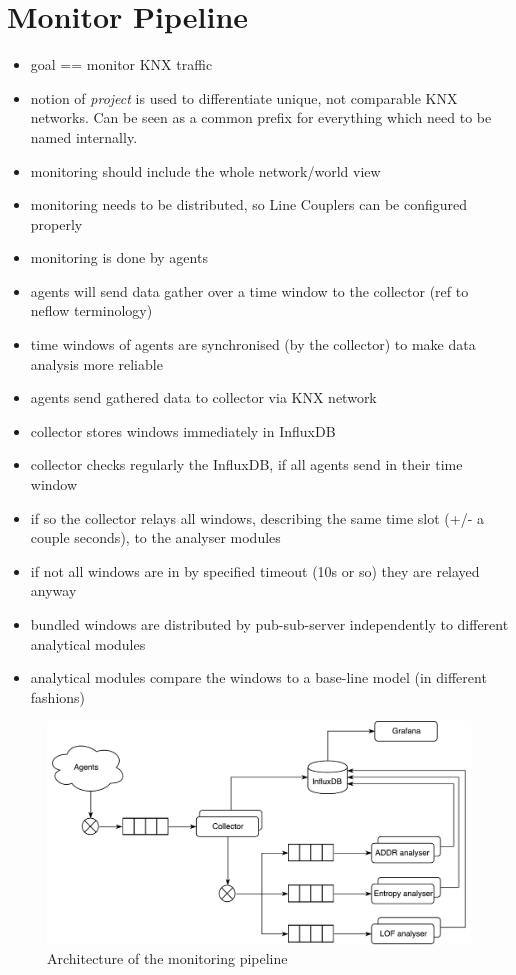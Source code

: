 
\section{Monitor Pipeline}
\label{sec:concept:pipeline}

\begin{itemize}
	\item goal == monitor KNX traffic
	\item notion of \emph{project} is used to differentiate unique, not comparable KNX networks. Can be seen as a common prefix for everything which need to be named internally.
	\item monitoring should include the whole network/world view
	\item monitoring needs to be distributed, so Line Couplers can be configured properly
	\item monitoring is done by agents
	\item agents will send data gather over a time window to the collector (ref to neflow terminology)
	\item time windows of agents are synchronised (by the collector) to make data analysis more reliable
	\item agents send gathered data to collector via KNX network
	\item collector stores windows immediately in InfluxDB
	\item collector checks regularly the InfluxDB, if all agents send in their time window
	\item if so the collector relays all windows, describing the same time slot (+/- a couple seconds), to the analyser modules
	\item if not all windows are in by specified timeout (10s or so) they are relayed anyway
	\item bundled windows are distributed by pub-sub-server independently to different analytical modules
	\item analytical modules compare the windows to a base-line model (in different fashions)
\end{itemize}

\begin{figure}[h]
	\centering
	\includegraphics[width=\textwidth]{figures/300-concept-architecture.pdf}
	\caption[Pipeline Architecture]{Architecture of the monitoring pipeline}
	\label{fig:concept:architecture}
\end{figure}

